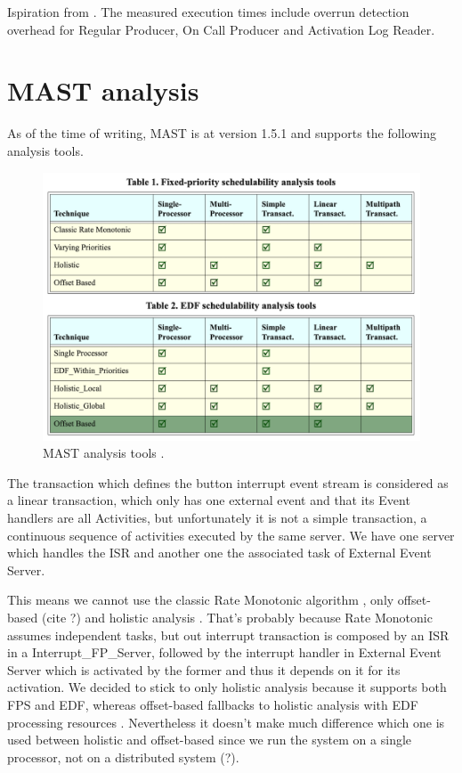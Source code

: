 \documentclass{article}
\begin{document}
Ispiration from \cite{overrundetection}. The measured execution times include overrun detection overhead for Regular Producer, On Call Producer and Activation Log Reader.

\section{MAST analysis}

As of the time of writing, MAST is at version 1.5.1 and supports the following analysis tools.

\begin{figure}[!htbp]
\centering
\includegraphics[width=5in]{images/mast-analysis}
\caption{MAST analysis tools \cite{mast-description}.}
\label{mast-analysis-tools}
\end{figure}

The transaction which defines the button interrupt event stream is considered as a linear transaction, which only has one external event and that its Event handlers are all Activities, but unfortunately it is not a simple transaction, a continuous sequence of activities executed by the same server. We have one server which handles the ISR and another one the associated task of External Event Server.

This means we cannot use the classic Rate Monotonic algorithm \cite{rm-dm}, only offset-based (cite ?) and holistic analysis \cite{holistic-analysis}. That's probably because Rate Monotonic assumes independent tasks, but out interrupt transaction is composed by an ISR in a Interrupt\_FP\_Server, followed by the interrupt handler in External Event Server which is activated by the former and thus it depends on it for its activation. We decided to stick to only holistic analysis because it supports both FPS and EDF, whereas offset-based fallbacks to holistic analysis with EDF processing resources \cite{mast-readme}. Nevertheless it doesn't make much difference which one is used between holistic and offset-based since we run the system on a single processor, not on a distributed system (?).
\end{document}
